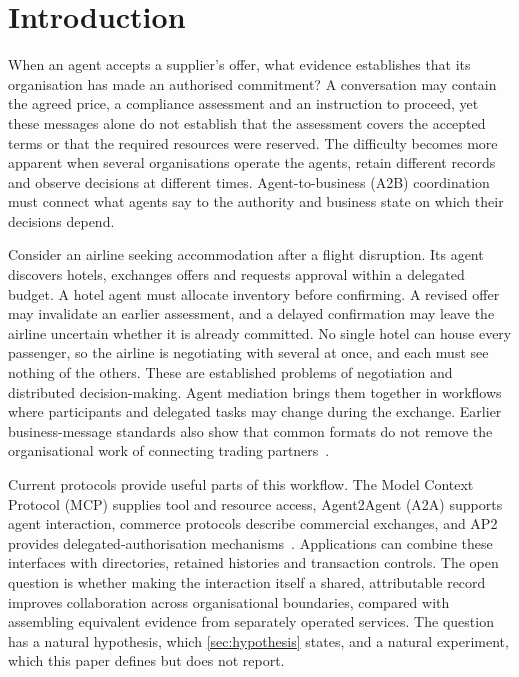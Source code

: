 \section{Introduction}
\label{sec:introduction}

When an agent accepts a supplier's offer, what evidence establishes that its organisation has made an authorised commitment? A conversation may contain the agreed price, a compliance assessment and an instruction to proceed, yet these messages alone do not establish that the assessment covers the accepted terms or that the required resources were reserved. The difficulty becomes more apparent when several organisations operate the agents, retain different records and observe decisions at different times. Agent-to-business (A2B) coordination must connect what agents say to the authority and business state on which their decisions depend.

Consider an airline seeking accommodation after a flight disruption. Its agent discovers hotels, exchanges offers and requests approval within a delegated budget. A hotel agent must allocate inventory before confirming. A revised offer may invalidate an earlier assessment, and a delayed confirmation may leave the airline uncertain whether it is already committed. No single hotel can house every passenger, so the airline is negotiating with several at once, and each must see nothing of the others. These are established problems of negotiation and distributed decision-making. Agent mediation brings them together in workflows where participants and delegated tasks may change during the exchange. Earlier business-message standards also show that common formats do not remove the organisational work of connecting trading partners~\citep{iacovou1995edi}.

Current protocols provide useful parts of this workflow. The Model Context Protocol (MCP) supplies tool and resource access, Agent2Agent (A2A) supports agent interaction, commerce protocols describe commercial exchanges, and AP2 provides delegated-authorisation mechanisms~\citep{mcp2026spec,a2a2026spec,ucpspec,acpspec,ap2auth}. Applications can combine these interfaces with directories, retained histories and transaction controls. The open question is whether making the interaction itself a shared, attributable record improves collaboration across organisational boundaries, compared with assembling equivalent evidence from separately operated services. The question has a natural hypothesis, which \cref{sec:hypothesis} states, and a natural experiment, which this paper defines but does not report.

